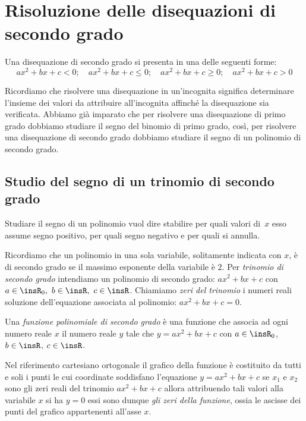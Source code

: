 \section{Risoluzione delle disequazioni di secondo grado}
\label{sec:diseq_secondo_grado}

Una disequazione di secondo grado si presenta in una delle seguenti forme:
\[ax^2+bx+c<0;\quad ax^2+bx+c\le 0;\quad ax^2+bx+c\ge0;\quad ax^2+bx+c> 0\]

Ricordiamo che risolvere una disequazione in un'incognita significa 
determinare 
l'insieme dei valori da attribuire all'incognita affinché la disequazione sia 
verificata.
Abbiamo già imparato che per risolvere una disequazione di primo grado 
dobbiamo 
studiare il segno del binomio di primo grado, così, per risolvere una 
disequazione di secondo grado dobbiamo studiare il segno di un polinomio di 
secondo grado.

\subsection{Studio del segno di un trinomio di secondo grado}
\label{sec:diseq_trinomio}

Studiare il segno di un polinomio vuol dire stabilire per quali valori 
di~$x$ esso assume segno positivo, per quali segno negativo e per quali 
si annulla.

Ricordiamo che un polinomio in una sola variabile, solitamente indicata con 
$x$, 
è di secondo grado se il massimo esponente della variabile è $2$. 
Per \emph{trinomio di secondo grado} intendiamo un polinomio di secondo 
grado: 
$ax^2+bx+c$ con $a\in \insR_{0},~b\in \insR,~c\in \insR$. 
Chiamiamo \emph{zeri del trinomio} i numeri reali soluzione dell'equazione 
associata al polinomio: $ax^2+bx+c=0$.

\begin{definizione}
Una \emph{funzione polinomiale di secondo grado} è una funzione che associa 
ad 
ogni numero reale $x$ il numero reale $y$ tale che
$y=ax^2+bx+c$ con $a\in \insR_{0}$, $b\in \insR$, $c\in \insR$.
\end{definizione}

Nel riferimento cartesiano ortogonale il grafico della funzione è costituito 
da 
tutti e soli i punti le cui coordinate soddisfano l'equazione $y=ax^2+bx+c$ 
se 
$x_1$ e $x_2$ sono gli zeri reali del trinomio $ax^2+bx+c$ allora attribuendo 
tali valori alla variabile $x$ si ha $y=0$ essi sono dunque \emph{gli zeri 
della 
funzione}, ossia le ascisse dei punti del grafico appartenenti all'asse $x$.

